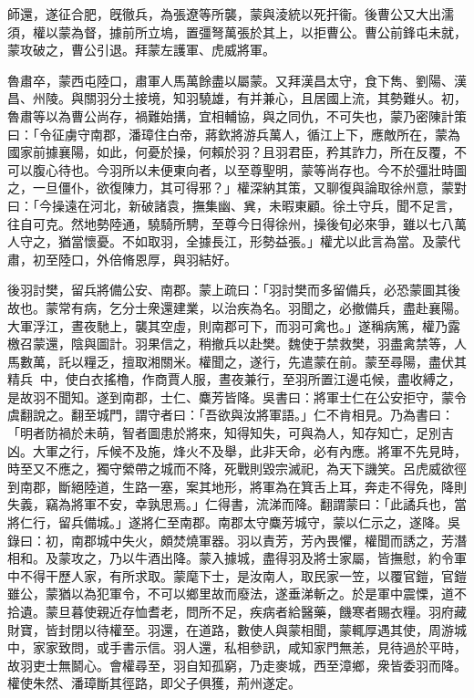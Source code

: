 \begin{pinyinscope}
師還，遂征合肥，旣徹兵，為張遼等所襲，蒙與淩統以死扞衞。後曹公又大出濡須，權以蒙為督，據前所立塢，置彊弩萬張於其上，以拒曹公。曹公前鋒屯未就，蒙攻破之，曹公引退。拜蒙左護軍、虎威將軍。

魯肅卒，蒙西屯陸口，肅軍人馬萬餘盡以屬蒙。又拜漢昌太守，食下雋、劉陽、漢昌、州陵。與關羽分土接境，知羽驍雄，有并兼心，且居國上流，其勢難乆。初，魯肅等以為曹公尚存，禍難始搆，宜相輔協，與之同仇，不可失也，蒙乃密陳計策曰：「令征虜守南郡，潘璋住白帝，蔣欽將游兵萬人，循江上下，應敵所在，蒙為國家前據襄陽，如此，何憂於操，何賴於羽？且羽君臣，矜其詐力，所在反覆，不可以腹心待也。今羽所以未便東向者，以至尊聖明，蒙等尚存也。今不於彊壯時圖之，一旦僵仆，欲復陳力，其可得邪？」權深納其策，又聊復與論取徐州意，蒙對曰：「今操遠在河北，新破諸袁，撫集幽、兾，未暇東顧。徐土守兵，聞不足言，往自可克。然地勢陸通，驍騎所騁，至尊今日得徐州，操後旬必來爭，雖以七八萬人守之，猶當懷憂。不如取羽，全據長江，形勢益張。」權尤以此言為當。及蒙代肅，初至陸口，外倍脩恩厚，與羽結好。

後羽討樊，留兵將備公安、南郡。蒙上疏曰：「羽討樊而多留備兵，必恐蒙圖其後故也。蒙常有病，乞分士衆還建業，以治疾為名。羽聞之，必撤備兵，盡赴襄陽。大軍浮江，晝夜馳上，襲其空虛，則南郡可下，而羽可禽也。」遂稱病篤，權乃露檄召蒙還，陰與圖計。羽果信之，稍撤兵以赴樊。魏使于禁救樊，羽盡禽禁等，人馬數萬，託以糧乏，擅取湘關米。權聞之，遂行，先遣蒙在前。蒙至尋陽，盡伏其精兵𦩷𦪇中，使白衣搖櫓，作商賈人服，晝夜兼行，至羽所置江邊屯候，盡收縛之，是故羽不聞知。遂到南郡，士仁、麋芳皆降。吳書曰：將軍士仁在公安拒守，蒙令虞翻說之。翻至城門，謂守者曰：「吾欲與汝將軍語。」仁不肯相見。乃為書曰：「明者防禍於未萌，智者圖患於將來，知得知失，可與為人，知存知亡，足別吉凶。大軍之行，斥候不及施，烽火不及舉，此非天命，必有內應。將軍不先見時，時至又不應之，獨守縈帶之城而不降，死戰則毀宗滅祀，為天下譏笑。呂虎威欲徑到南郡，斷絕陸道，生路一塞，案其地形，將軍為在箕舌上耳，奔走不得免，降則失義，竊為將軍不安，幸孰思焉。」仁得書，流涕而降。翻謂蒙曰：「此譎兵也，當將仁行，留兵備城。」遂將仁至南郡。南郡太守麋芳城守，蒙以仁示之，遂降。吳錄曰：初，南郡城中失火，頗焚燒軍器。羽以責芳，芳內畏懼，權聞而誘之，芳潛相和。及蒙攻之，乃以牛酒出降。蒙入據城，盡得羽及將士家屬，皆撫慰，約令軍中不得干歷人家，有所求取。蒙麾下士，是汝南人，取民家一笠，以覆官鎧，官鎧雖公，蒙猶以為犯軍令，不可以鄉里故而廢法，遂垂涕斬之。於是軍中震慄，道不拾遺。蒙旦暮使親近存恤耆老，問所不足，疾病者給醫藥，饑寒者賜衣糧。羽府藏財寶，皆封閉以待權至。羽還，在道路，數使人與蒙相聞，蒙輒厚遇其使，周游城中，家家致問，或手書示信。羽人還，私相參訊，咸知家門無恙，見待過於平時，故羽吏士無鬬心。會權尋至，羽自知孤窮，乃走麥城，西至漳鄉，衆皆委羽而降。權使朱然、潘璋斷其徑路，即父子俱獲，荊州遂定。


\end{pinyinscope}
